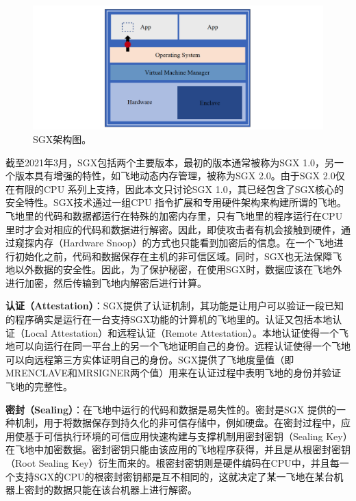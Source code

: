 \begin{figure}[h]
    \centerline{\includegraphics[width=\textwidth]{figures/sgx-arch.png}}
    \caption{SGX架构图。}
    \label{sgx_arch}
\end{figure}

截至2021年3月，SGX包括两个主要版本，最初的版本通常被称为SGX 1.0，另一个版本具有增强的特性，如飞地动态内存管理，被称为SGX 2.0。由于SGX 2.0仅在有限的CPU 系列上支持，因此本文只讨论SGX 1.0，其已经包含了SGX核心的安全特性。SGX技术通过一组CPU 指令扩展和专用硬件架构来构建所谓的飞地。飞地里的代码和数据都运行在特殊的加密内存里，只有飞地里的程序运行在CPU 里时才会对相应的代码和数据进行解密。因此，即使攻击者有机会接触到硬件，通过窥探内存（Hardware Snoop）的方式也只能看到加密后的信息。在一个飞地进行初始化之前，代码和数据保存在主机的非可信区域。同时，SGX也无法保障飞地以外数据的安全性。因此，为了保护秘密，在使用SGX时，数据应该在飞地外进行加密，然后传输到飞地内解密后进行计算。

\textbf{认证（Attestation）}：SGX提供了认证机制，其功能是让用户可以验证一段已知的程序确实是运行在一台支持SGX功能的计算机的飞地里的。认证又包括本地认证（Local Attestation）和远程认证（Remote Attestation）。本地认证使得一个飞地可以向运行在同一平台上的另一个飞地证明自己的身份。远程认证使得一个飞地可以向远程第三方实体证明自己的身份。SGX提供了飞地度量值（即MRENCLAVE和MRSIGNER两个值）用来在认证过程中表明飞地的身份并验证飞地的完整性。

\textbf{密封（Sealing）}：在飞地中运行的代码和数据是易失性的。密封是SGX 提供的一种机制，用于将数据保存到持久化的非可信存储中，例如硬盘。在密封过程中，应用使基于可信执行环境的可信应用快速构建与支撑机制用密封密钥（Sealing Key）在飞地中加密数据。密封密钥只能由该应用的飞地程序获得，并且是从根密封密钥（Root Sealing Key）衍生而来的。根密封密钥则是硬件编码在CPU中，并且每一个支持SGX的CPU的根密封密钥都是互不相同的，这就决定了某一飞地在某台机器上密封的数据只能在该台机器上进行解密。


